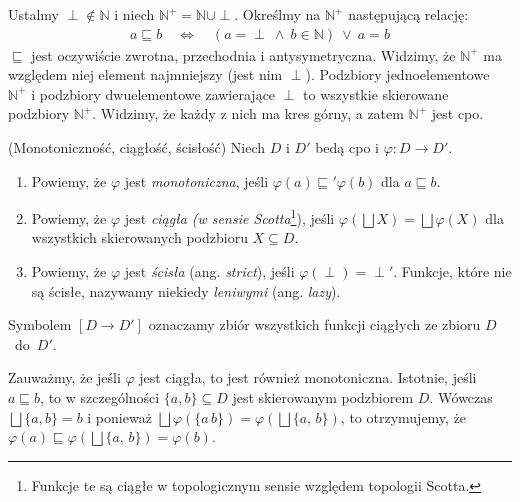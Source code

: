 \begin{przyklad}\label{ex:scott_d0}
  Ustalmy \(\perp\not\in \mathbb{N}\) i niech \(\mathbb{N}^{+}=\mathbb{N}\cup{\perp}\). Określmy na \(\mathbb{N}^+\) następującą relację:
  \begin{align*}
    a \sqsubseteq b \quad \Leftrightarrow\quad (a=\perp\ \land\ b\in \mathbb{N})\ \lor\ a = b
  \end{align*}
  \(\sqsubseteq\) jest oczywiście zwrotna, przechodnia i antysymetryczna. Widzimy, że \(\mathbb{N}^{+}\) ma względem niej element najmniejszy (jest nim  \(\perp\)). Podzbiory jednoelementowe \(\mathbb{N}^{+}\) i podzbiory dwuelementowe zawierające \(\perp\) to wszystkie skierowane podzbiory \(\mathbb{N}^{+}\). Widzimy, że każdy z nich ma kres górny, a zatem \(\mathbb{N}^{+}\) jest cpo.
\end{przyklad}

\begin{definicja}(Monotoniczność, ciągłość, ścisłość)\label{def:m_cont} %
Niech \(D\) i \(D'\) bedą cpo i \(\varphi: D\to D'\).
\begin{enumerate}[label={(\alph*)}, ref={(\alph*)}] 
  \setlength\itemsep{0em}
\item Powiemy, że \(\varphi\) jest \emph{monotoniczna}, jeśli \(\varphi(a) \sqsubseteq' \varphi(b)\) dla \(a\sqsubseteq b\).
\item Powiemy, że \(\varphi\) jest \emph{ciągła (w sensie Scotta}\footnote{Funkcje te są ciągłe w topologicznym sensie względem topologii Scotta.}), jeśli \(\varphi(\bigsqcup X) = \bigsqcup \varphi (X)\) dla wszystkich skierowanych podzbioru \(X\subseteq D\).\label{def:m_cont_2}
\item Powiemy, że \(\varphi\) jest \emph{ścisła} (ang. \emph{strict}), jeśli \(\varphi(\perp)=\perp'\). Funkcje, które nie są ścisłe, nazywamy niekiedy \emph{leniwymi} (ang. \emph{lazy}).
\end{enumerate}
Symbolem \([D\to D']\) oznaczamy zbiór wszystkich funkcji ciągłych ze zbioru \(D\)~do~\(D'\).
\end{definicja}

\begin{uwaga*}
Zauważmy, że jeśli \(\varphi\) jest ciągła, to jest również monotoniczna. Istotnie, jeśli \(a\sqsubseteq b\), to w szczególności \(\{a, b\}\subseteq D\) jest skierowanym podzbiorem \(D\). Wówczas \(\bigsqcup\{a, b\}=b\) i ponieważ \(\bigsqcup \varphi(\{a\,b\})=\varphi(\bigsqcup\{a,\,b\})\), to otrzymujemy, że \(\varphi(a)\sqsubseteq \varphi(\bigsqcup\{a,\,b\}) = \varphi(b)\).
\end{uwaga*}


